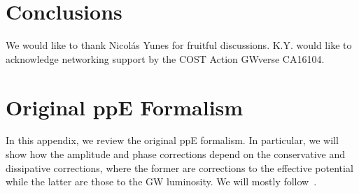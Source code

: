 \documentclass[prd,twocolumn,nofootinbib]{revtex4-1}
\begin{document}
\begin{comment}
 \hline
 \vspace{20pt}
 \tiny Varying-G Theory&\rule{0pt}{4ex}\tiny $\bm{-\frac{75 m_0 {\eta_0}^{3/5}}{851968 {G_0}^{10/3}} \bigg(\frac{11 \dot{G}}{3 G_0} + \frac{17 \dot{M}}{3M_0}-\frac{m_{1,0}\dot{m_2}+m_{2,0}\dot{m_1}}{{m_0}^2 \eta0}\bigg)}$&\tiny-13&\tiny$\bm{\frac{-5 m_0 {\eta_0}^{3/5}}{512 {G_0}^{5/3}} \bigg(\frac{7 \dot{G}}{ G_0} + \frac{5\dot{M}}{m_0}+\frac{m_{1,0}\dot{m_2}+m_{2,0}\dot{m_1}}{{m_0}^2 \eta0}\bigg)}$&\tiny-8\\
\hline
\end{tabular}
\end{comment}

\section{Conclusions}
\label{sec:conclusions}

\acknowledgments
We would like to thank Nicol\' as Yunes for fruitful discussions.
K.Y. would like to acknowledge networking support by the COST Action GWverse CA16104.

 \appendix 
 
 \section{Original ppE Formalism}
 \label{appendix}

In this appendix, we review the original ppE formalism. In particular, we will show how the amplitude and phase corrections depend on the conservative and dissipative corrections, where the former are corrections to the effective potential while the latter are those to the GW luminosity. We will mostly follow~\cite{Chatziioannou:2012rf}.
\end{document}
